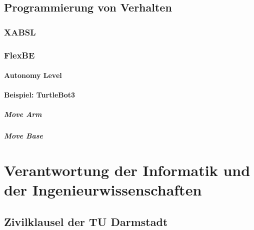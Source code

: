 \documentclass[a4paper, 11pt, accentcolor = tud3b]{tudreport}
\begin{document}
		\section{Programmierung von Verhalten} %

			\subsection{XABSL} %

			\subsection{FlexBE} %

				\subsubsection{Autonomy Level} %

				\subsubsection{Beispiel: TurtleBot3} %

					\paragraph{Move Arm} %

					\paragraph{Move Base} %

	\chapter{Verantwortung der Informatik und der Ingenieurwissenschaften} %

		\section{Zivilklausel der TU Darmstadt} %
\end{document}
